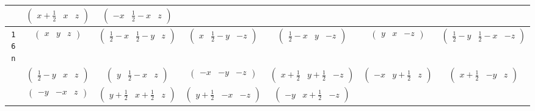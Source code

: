 \documentclass[fleqn,9pt,landscape]{jsarticle}
\begin{document}
\begin{center}
\begin{longtable}{ccccccc}
& $ \begin{pmatrix} x + \frac{1}{2} & x & z \end{pmatrix} $ & $ \begin{pmatrix} - x & \frac{1}{2} - x & z \end{pmatrix} $ & $  $ & $  $ & $  $ & $  $ \\ \hline
{\tt 16n} & $ \begin{pmatrix} x & y & z \end{pmatrix} $ & $ \begin{pmatrix} \frac{1}{2} - x & \frac{1}{2} - y & z \end{pmatrix} $ & $ \begin{pmatrix} x & \frac{1}{2} - y & - z \end{pmatrix} $ & $ \begin{pmatrix} \frac{1}{2} - x & y & - z \end{pmatrix} $ & $ \begin{pmatrix} y & x & - z \end{pmatrix} $ & $ \begin{pmatrix} \frac{1}{2} - y & \frac{1}{2} - x & - z \end{pmatrix} $ \\
& $ \begin{pmatrix} \frac{1}{2} - y & x & z \end{pmatrix} $ & $ \begin{pmatrix} y & \frac{1}{2} - x & z \end{pmatrix} $ & $ \begin{pmatrix} - x & - y & - z \end{pmatrix} $ & $ \begin{pmatrix} x + \frac{1}{2} & y + \frac{1}{2} & - z \end{pmatrix} $ & $ \begin{pmatrix} - x & y + \frac{1}{2} & z \end{pmatrix} $ & $ \begin{pmatrix} x + \frac{1}{2} & - y & z \end{pmatrix} $ \\
& $ \begin{pmatrix} - y & - x & z \end{pmatrix} $ & $ \begin{pmatrix} y + \frac{1}{2} & x + \frac{1}{2} & z \end{pmatrix} $ & $ \begin{pmatrix} y + \frac{1}{2} & - x & - z \end{pmatrix} $ & $ \begin{pmatrix} - y & x + \frac{1}{2} & - z \end{pmatrix} $ & $  $ & $  $ \\
\end{longtable}
\end{center}
\end{document}
